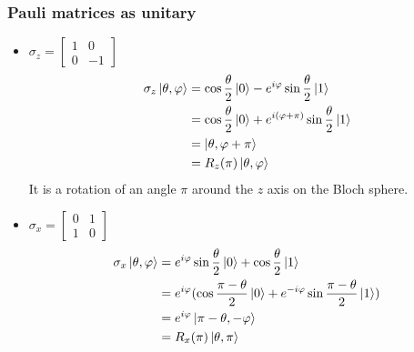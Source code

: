 \documentclass{article}
\begin{document}
\subsubsection*{Pauli matrices as unitary}

\begin{itemize}[label=-]
    \item $\sigma_z = \begin{bmatrix}
        1 & 0 \\ 0 & -1
    \end{bmatrix}$
    \begin{equation}
        \begin{aligned}
            \sigma_z\ket{\theta, \varphi}
                & = \cos \frac{\theta}{2}\ket{0} - e^{i\varphi}\sin\frac{\theta}{2}\ket{1} \\
                & = \cos \frac{\theta}{2}\ket{0} + e^{i(\varphi + \pi)}\sin\frac{\theta}{2}\ket{1} \\
                & = \ket{\theta, \varphi + \pi} \\
                & = R_z(\pi)\ket{\theta, \varphi}
        \end{aligned}
    \end{equation}
    It is a rotation of an angle $\pi$ around the $z$ axis on the Bloch sphere.

    \item $\sigma_x = \begin{bmatrix}
        0 & 1 \\ 1 & 0
    \end{bmatrix}$
    \begin{equation}
        \begin{aligned}
            \sigma_x\ket{\theta, \varphi}
                & = e^{i\varphi}\sin\frac{\theta}{2}\ket{0} + \cos\frac{\theta}{2}\ket{1} \\
                & = e^{i\varphi}(\cos\frac{\pi-\theta}{2}\ket{0} + e^{-i\varphi}\sin\frac{\pi-\theta}{2}\ket{1}) \\
                & = e^{i\varphi}\ket{\pi - \theta, -\varphi} \\
                & = R_x(\pi)\ket{\theta, \pi}
        \end{aligned}
    \end{equation}


\end{itemize}
\end{document}
